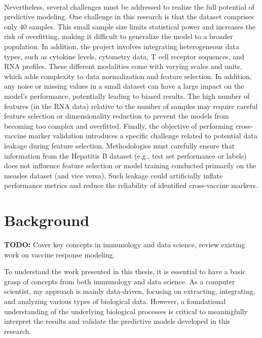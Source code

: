 \documentclass[12pt,a4paper]{report}
\newcommand{\todo}[1]{%
  \par\noindent%
  \begin{tcolorbox}[colback=yellow, colframe=black, boxrule=0.5pt, sharp corners, width=\linewidth, before skip=5pt, after skip=5pt]
    \textbf{TODO:} #1
  \end{tcolorbox}%
  \par
}
\begin{document}
\\
Nevertheless, several challenges must be addressed to realize the full potential of predictive modeling. One challenge in this research is that the dataset comprises only 40 samples. This small sample size limits statistical power and increases the risk of overfitting, making it difficult to generalize the model to a broader population. In addition, the project involves integrating heterogeneous data types, such as cytokine levels, cytometry data, T cell receptor sequences, and RNA profiles. These different modalities come with varying scales and units, which adds complexity to data normalization and feature selection. In addition, any noise or missing values in a small dataset can have a large impact on the model’s performance, potentially leading to biased results. The high number of features (in the RNA data) relative to the number of samples may require careful feature selection or dimensionality reduction to prevent the models from becoming too complex and overfitted.
Finally, the objective of performing cross-vaccine marker validation introduces a specific challenge related to potential data leakage during feature selection. Methodologies must carefully ensure that information from the Hepatitis B dataset (e.g., test set performance or labels) does not influence feature selection or model training conducted primarily on the measles dataset (and vice versa). Such leakage could artificially inflate performance metrics and reduce the reliability of identified cross-vaccine markers.





\chapter{Background}
\todo{Cover key concepts in immunology and data science, review existing work on vaccine response modeling.}
\noindent
To understand the work presented in this thesis, it is essential to have a basic grasp of concepts from both immunology and data science. As a computer scientist, my approach is mainly data-driven, focusing on extracting, integrating, and analyzing various types of biological data. However, a foundational understanding of the underlying biological processes is critical to meaningfully interpret the results and validate the predictive models developed in this research.
\end{document}
